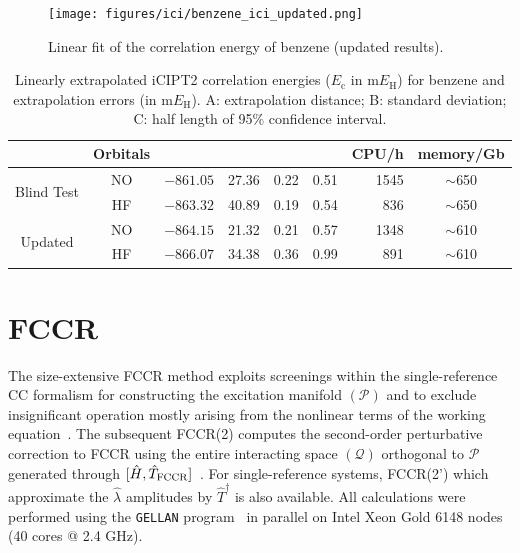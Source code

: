 \documentclass[journal=jcp,manuscript=suppinfo]{achemso}
\begin{document}
\begin{figure}[!htp]
	\centering
	\texttt{[image: figures/ici/benzene\_ici\_updated.png]}
	\caption{Linear fit of the correlation energy of benzene (updated results).}\label{BenzeneEnNew}
\end{figure}

\begin{table}[!htp]
	\centering
	\caption{Linearly extrapolated iCIPT2 correlation energies ($E_{\mathrm{c}}$ in m$E_{\text{H}}$) for benzene and
extrapolation errors (in m$E_{\text{H}}$). A: extrapolation distance; B: standard deviation; C:
half length of 95\% confidence interval.}
	\begin{tabular}{ccccccrc}\toprule
		&Orbitals
		&\makecell{$E_{\mathrm{c}}$}
		&\makecell{A}
		&\makecell{B}
		&\makecell{C}
		&CPU/h&memory/Gb
		\\\toprule
		\multirow{2}{*}{Blind Test}
		&NO&$-861.05$&27.36&0.22&0.51&1545&$\sim$650\\
		&HF&$-863.32$&40.89&0.19&0.54&836&$\sim$650\\\midrule
		\multirow{2}{*}{Updated}
		&NO&$-864.15$&21.32&0.21&0.57&1348&$\sim$610\\
		&HF&$-866.07$&34.38&0.36&0.99&891&$\sim$610\\\bottomrule
	\end{tabular}
\label{iCIsum}
\end{table}

\section{FCCR}

The size-extensive FCCR method exploits screenings within the single-reference CC formalism for constructing the excitation manifold $({\mathcal P})$ and to exclude insignificant operation mostly arising from the nonlinear terms of the working equation~\cite{ten_no_fcc_prl_2018}. The subsequent FCCR(2) computes the second-order perturbative correction to FCCR using the entire interacting space $({\mathcal Q})$ orthogonal to ${\mathcal P}$ generated through $[\hat H, \hat T_{\rm FCCR}]$~\cite{ten_no_fccr_2020}. For single-reference systems, FCCR(2') which approximate the $\hat \lambda$ amplitudes by $\hat T^{\dagger}$ is also available. All calculations were performed using the \texttt{GELLAN} program~\cite{gellan} in parallel on Intel Xeon Gold 6148 nodes (40 cores @ 2.4 GHz).\\
\end{document}
